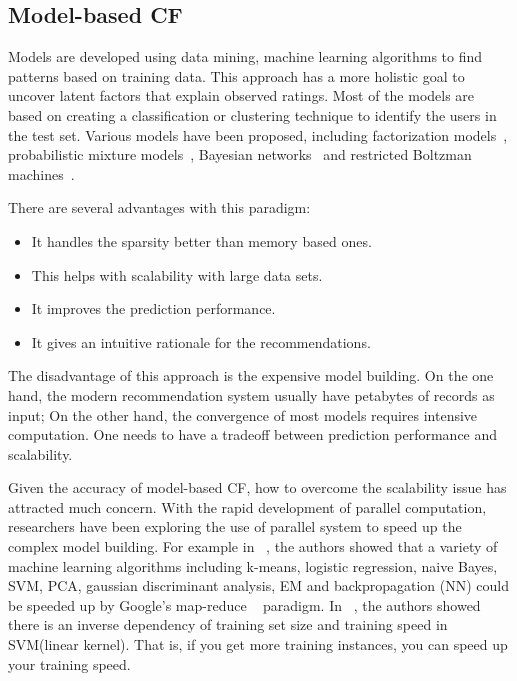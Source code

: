 \hspace{0.05in}
\subsection{Model-based CF}
Models are developed using data mining, machine learning algorithms to find patterns based on training data. This approach has a more holistic goal to uncover latent factors that explain observed ratings. Most of the models are based on creating a classification or clustering technique to identify the users in the test set.
Various models have been proposed, including factorization models~\cite{/computer/yehuda09matrix, /aaai/WPan12,paterek07,/tist/LibFM-TIST12},
probabilistic mixture models~\cite{hofmann04cf,jin:decoupled}, Bayesian networks~\cite{pennock00pd} and restricted Boltzman machines~\cite{/icml/SalakhutdinovMH07}.

There are several advantages with this paradigm:
\begin{itemize}
\item It handles the sparsity better than memory based ones.
\item This helps with scalability with large data sets.
\item It improves the prediction performance.
\item It gives an intuitive rationale for the recommendations.
\end{itemize}

The disadvantage of this approach is the expensive model building. On the one hand, the modern recommendation system usually have petabytes of records as input; On the other hand, the convergence of most models requires intensive computation. One needs to have a tradeoff between prediction performance and scalability.

Given the accuracy of model-based CF, how to overcome the scalability issue has attracted much concern. With the rapid development of parallel computation, researchers have been exploring the use of parallel system to speed up the complex model building. For example in ~\cite{chu2007map}, the authors showed that a variety of machine learning algorithms including k-means, logistic regression, naive Bayes, SVM, PCA, gaussian discriminant analysis, EM and backpropagation (NN) could be speeded up by Google's map-reduce ~\cite{dean2008mapreduce} paradigm. In ~\cite{Shalev-Shwartz:2008:SOI:1390156.1390273}, the authors showed there is an inverse dependency of training set size and training speed in SVM(linear kernel). That is, if you get more training instances, you can speed up your training speed.

